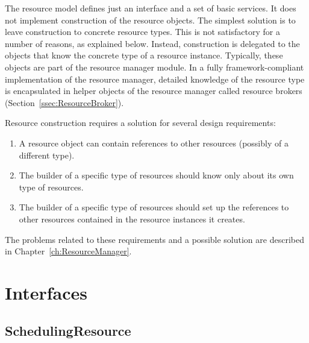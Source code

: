 \documentclass[a4paper,twoside]{tce}
\begin{document}
The resource model defines just an interface and a set of basic services. It
does not implement construction of the resource objects. The simplest
solution is to leave construction to concrete resource types. This is not
satisfactory for a number of reasons, as explained below. Instead,
construction is delegated to the objects that know the concrete type of a
resource instance. Typically, these objects are part of the resource manager
module. In a fully framework-compliant implementation of the resource
manager, detailed knowledge of the resource type is encapsulated in helper
objects of the resource manager called resource brokers
(Section~\ref{ssec:ResourceBroker}).

Resource construction requires a solution for several design requirements:
\begin{enumerate}
\item %
  A resource object can contain references to other resources (possibly of a
  different type).
\item %
  The builder of a specific type of resources should know only about its own
  type of resources.
\item %
  The builder of a specific type of resources should set up the references
  to other resources contained in the resource instances it creates.
\end{enumerate}

The problems related to these requirements and a possible solution are
described in Chapter~\ref{ch:ResourceManager}.

\section{Interfaces}

\subsection{SchedulingResource}
\end{document}
